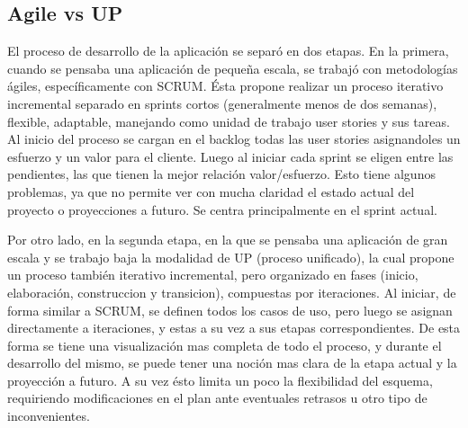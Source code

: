 \subsection{Agile vs UP}

El proceso de desarrollo de la aplicaci\'on se separ\'o en dos etapas. En la primera, cuando se pensaba una aplicaci\'on de peque\~na escala, se trabaj\'o con metodolog\'ias \'agiles, espec\'ificamente con SCRUM. Ésta propone realizar un proceso iterativo incremental separado en sprints cortos (generalmente menos de dos semanas), flexible, adaptable, manejando como unidad de trabajo user stories y sus tareas. Al inicio del proceso se cargan en el backlog todas las user stories asignandoles un esfuerzo y un valor para el cliente. Luego al iniciar cada sprint se eligen entre las pendientes, las que tienen la mejor relaci\'on valor/esfuerzo. Esto tiene algunos problemas, ya que no permite ver con mucha claridad el estado actual del proyecto o proyecciones a futuro. Se centra principalmente en el sprint actual.

Por otro lado, en la segunda etapa, en la que se pensaba una aplicaci\'on de gran escala y se trabajo baja la modalidad de UP (proceso unificado), la cual propone un proceso tambi\'en iterativo incremental, pero organizado en fases (inicio, elaboraci\'on, construccion y transicion), compuestas por iteraciones. Al iniciar, de forma similar a SCRUM, se definen todos los casos de uso, pero luego se asignan directamente a iteraciones, y estas a su vez a sus etapas correspondientes. De esta forma se tiene una visualizaci\'on mas completa de todo el proceso, y durante el desarrollo del mismo, se puede tener una noci\'on mas clara de la etapa actual y la proyecci\'on a futuro. A su vez \'esto limita un poco la flexibilidad del esquema, requiriendo modificaciones en el plan ante eventuales retrasos u otro tipo de inconvenientes.